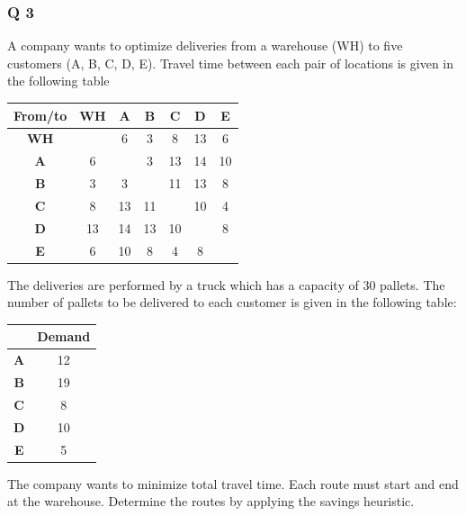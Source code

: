 \documentclass[10pt]{article}
\begin{document}
\subsubsection{Q 3}
A company wants to optimize deliveries from a warehouse (WH) to five customers (A, B, C, D, E). Travel time between each pair of locations is given in the following table
\begin{center}
    \begin{tabular}{|c|c|c|c|c|c|c|}
        \hline 
        From/to & \textbf{WH} & \textbf{A} & \textbf{B} & \textbf{C} & \textbf{D} & \textbf{E}\\\hline 
        \textbf{WH} &  & 6 & 3 & 8 & 13 & 6\\\hline 
        \textbf{A} & 6 &   & 3 & 13 & 14 & 10\\\hline 
        \textbf{B} & 3 & 3 &   & 11 & 13 & 8\\\hline 
        \textbf{C} & 8 & 13 & 11 &   & 10 & 4\\\hline 
        \textbf{D} & 13 & 14 & 13 & 10 &   & 8\\\hline 
        \textbf{E} & 6 & 10 & 8 & 4 & 8 &  \\\hline 
    \end{tabular}
\end{center}
The deliveries are performed by a truck which has a capacity of 30 pallets. The number of pallets to be delivered to each customer is given in the following table: 
\begin{center}
    \begin{tabular}{|c|c|}
        \hline 
        & \textbf{Demand}\\\hline 
        \textbf{A} & 12 \\\hline 
        \textbf{B} & 19 \\\hline 
        \textbf{C} & 8 \\\hline 
        \textbf{D} & 10 \\\hline 
        \textbf{E} & 5 \\\hline 
    \end{tabular}
\end{center}
The company wants to minimize total travel time. Each route must start and end at the warehouse. Determine the routes by applying the savings heuristic. 
\end{document}

